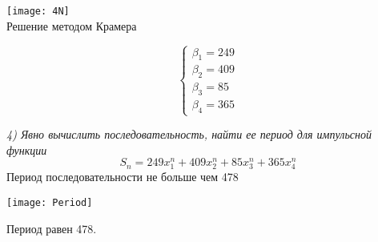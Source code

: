 \begin{center}
  \texttt{[image: 4N]}\\
  Решение методом Крамера
\end{center}

\begin{equation*}
 \begin{cases}
    \beta_1 = 249\\
    \beta_2 = 409\\
    \beta_3 = 85\\
    \beta_4 = 365
 \end{cases}
\end{equation*}

\emph {4) Явно вычислить последовательность, найти ее период для импульсной
функции}\\
\[S_n = 249 x_1^n + 409 x_2^n + 85 x_3^n +
365 x_4^n\]
Период последовательности не больше чем 478\\

\begin{center}
  \texttt{[image: Period]}\\
\end{center}

Период равен 478.